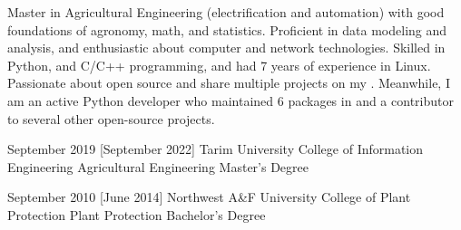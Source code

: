 \documentclass{resume}
\begin{document}
\makeheader

Master in Agricultural Engineering (electrification and automation)
with good foundations of agronomy, math, and statistics.
Proficient in data modeling and analysis,
and enthusiastic about computer and network technologies.
Skilled in Python, and C/C++ programming, and had 7 years of experience in Linux.
Passionate about open source and share multiple projects on my
.
Meanwhile, I am an active Python developer who maintained 6 packages in
 and a contributor to several other
open-source projects.

\begin{competences}[10em]
\end{competences}

\begin{educations}
  \education%
    {September 2019}%
    [September 2022]%
    {Tarim University}%
    {College of Information Engineering}%
    {Agricultural Engineering}%
    {Master's Degree}

  \separator{0.5ex}
  \education%
    {September 2010}%
    [June 2014]%
    {Northwest A\&F University}%
    {College of Plant Protection}%
    {Plant Protection}%
    {Bachelor's Degree}
\end{educations}
\end{document}

